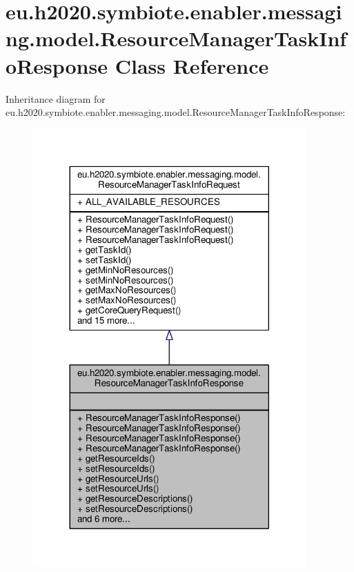 \hypertarget{classeu_1_1h2020_1_1symbiote_1_1enabler_1_1messaging_1_1model_1_1ResourceManagerTaskInfoResponse}{}\section{eu.\+h2020.\+symbiote.\+enabler.\+messaging.\+model.\+Resource\+Manager\+Task\+Info\+Response Class Reference}
\label{classeu_1_1h2020_1_1symbiote_1_1enabler_1_1messaging_1_1model_1_1ResourceManagerTaskInfoResponse}


Inheritance diagram for eu.\+h2020.\+symbiote.\+enabler.\+messaging.\+model.\+Resource\+Manager\+Task\+Info\+Response\+:
\nopagebreak
\begin{figure}[H]
\begin{center}
\leavevmode
\includegraphics[width=296pt]{classeu_1_1h2020_1_1symbiote_1_1enabler_1_1messaging_1_1model_1_1ResourceManagerTaskInfoResponse__inherit__graph}
\end{center}
\end{figure}


